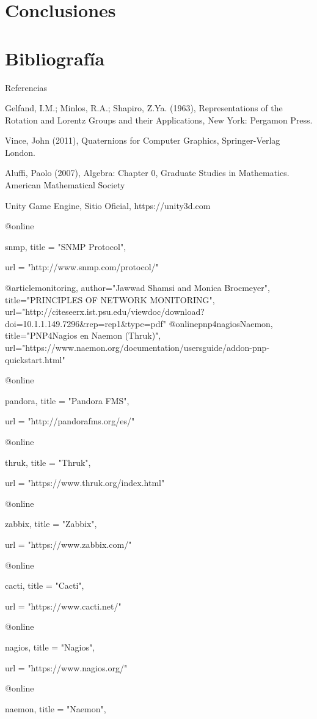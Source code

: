 \documentclass{beamer}
\theoremstyle{plain}
\theoremstyle{definition}
\theoremstyle{plain}
\theoremstyle{definition}
\theoremstyle{remark}
\theoremstyle{definition}
\begin{document}
\section{Conclusiones}
\section{Bibliografía}
\begin{frame}{Referencias}
	
	\begin{thebibliography}{9}
		
		Gelfand, I.M.; Minlos, R.A.; Shapiro, Z.Ya. (1963),
		Representations of the Rotation and Lorentz Groups and their Applications,
		New York: Pergamon Press.
		
		Vince, John (2011),
		Quaternions for Computer Graphics,
		Springer-Verlag London.
		
		Aluffi, Paolo (2007),
		Algebra: Chapter 0,
		Graduate Studies in Mathematics. American Mathematical Society
		
		Unity Game Engine,
		Sitio Oficial,
		https://unity3d.com
		
		@online{snmp,
			title  = "SNMP Protocol",
			
			url    = "http://www.snmp.com/protocol/"
		}
		
		@article{monitoring,
			author="Jawwad Shamsi and Monica Brocmeyer",
			title="PRINCIPLES OF NETWORK MONITORING",
			url="http://citeseerx.ist.psu.edu/viewdoc/download?doi=10.1.1.149.7296&rep=rep1&type=pdf"
		}
		@online{pnp4nagiosNaemon,
			title="PNP4Nagios en Naemon (Thruk)",
			url="https://www.naemon.org/documentation/usersguide/addon-pnp-quickstart.html"}
		
		@online{pandora,
			title  = "Pandora FMS",
			
			url    = "http://pandorafms.org/es/"
		}
		@online{thruk,
			title  = "Thruk",
			
			url    = "https://www.thruk.org/index.html"
		}
		@online{zabbix,
			title  = "Zabbix",
			
			url    = "https://www.zabbix.com/"
		}
		
		@online{cacti,
			title  = "Cacti",
			
			url    = "https://www.cacti.net/"
		}
		@online{nagios,
			title  = "Nagios",
			
			url    = "https://www.nagios.org/"
		}
		@online{naemon,
			title  = "Naemon",
			
}
\end{thebibliography}
\end{frame}
\end{document}
